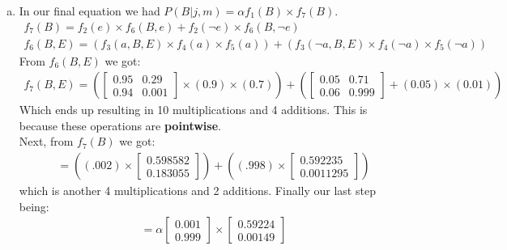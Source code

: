 \documentclass{article}
\begin{document}
\begin{enumerate}[a)]
\newpage
    \item In our final equation we had $P(B|j,m) = \alpha f_1(B) \times f_7(B)$.
    \begin{gather*}
        f_7(B) = f_2(e) \times f_6(B, e) + f_2(\neg e) \times f_6(B, \neg e)\\
        f_6(B,E) = (f_3(a, B, E) \times f_4(a) \times f_5(a)) +
            (f_3(\neg a, B, E) \times f_4(\neg a) \times f_5(\neg a))
    \end{gather*}
    From $f_6(B, E)$ we got:
    \begin{gather*}
        f_7(B, E) = (
        \begin{bmatrix}
            0.95 & 0.29 \\
            0.94 & 0.001
        \end{bmatrix}
        \times (0.9) \times (0.7)) + (
        \begin{bmatrix}
            0.05 & 0.71 \\
            0.06 & 0.999
        \end{bmatrix}
        + (0.05) \times (0.01))
    \end{gather*}
    Which ends up resulting in 10 multiplications and 4 additions. This is because these
    operations are \textbf{pointwise}.\\
    Next, from $f_7(B)$ we got:
    \begin{gather*}
        = ((.002) \times
        \begin{bmatrix}
            0.598582 \\
            0.183055
        \end{bmatrix})
        + ((.998) \times
        \begin{bmatrix}
            0.592235 \\
            0.0011295
        \end{bmatrix})
    \end{gather*}
    which is another 4 multiplications and 2 additions. Finally our last step being:
    \begin{gather*}
        = \alpha
        \begin{bmatrix}
            0.001 \\
            0.999
        \end{bmatrix}
        \times
        \begin{bmatrix}
            0.59224 \\
            0.00149
        \end{bmatrix}
    \end{gather*}

\end{enumerate}
\end{document}
